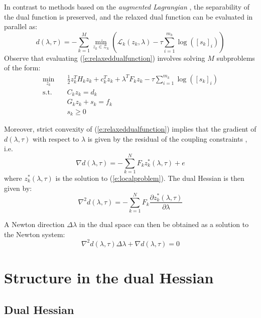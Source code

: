In contrast to methods based on the \emph{augmented Lagrangian} \cite{Kozma2013}, the separability of the dual function is preserved, and the relaxed dual function can be evaluated in parallel as:
\begin{equation}
\label{e:relaxeddualfunction}
d(\lambda, \tau) = -\sum_{k=1}^M \min_{z_k \in \mathcal{Z}_k} \left( \mathcal{L}_k(z_k, \lambda) - \tau \sum_{i=1}^{m_k} \log([s_k]_i) \right)
\end{equation}
Observe that evaluating (\ref{e:relaxeddualfunction}) involves solving $M$ subproblems of the form:
\begin{equation}
\label{e:localproblem}
\begin{aligned}
\min_{z_k} & \quad \frac{1}{2}z_k^T H_k z_k + c_k^T z_k + \lambda^TF_k z_k - \tau \sum_{i=1}^{m_k} \log([s_k]_i) \\
\text{s.t.} & \quad C_k z_k = d_k \\ 
& \quad G_k z_k + s_k = f_k \\
& \quad s_k \geq 0
\end{aligned}
\end{equation}

Moreover, strict convexity of (\ref{e:relaxeddualfunction}) implies that the gradient of $d(\lambda, \tau)$ with respect to $\lambda$ is given by the residual of the coupling constraints \cite{Bertsekas1989}, i.e.
\begin{equation}
\label{e:dualgradient}
\nabla d(\lambda, \tau) = -\sum_{k=1}^N F_k z_k^*(\lambda, \tau) + e
\end{equation}
where $z_k^*(\lambda, \tau)$ is the solution to (\ref{e:localproblem}).
The dual Hessian is then given by:
\begin{equation}
\label{e:dualhessian}
\nabla^2 d(\lambda, \tau) = -\sum_{k=1}^N F_k \frac{\partial z_k^*(\lambda, \tau)}{\partial \lambda}
\end{equation}

A Newton direction $\Delta \lambda$ in the dual space can then be obtained as a solution to the Newton system:
\begin{equation}
\label{e:NewtonSystem}
\nabla^2 d(\lambda, \tau) \Delta \lambda + \nabla d(\lambda, \tau) = 0
\end{equation}

\section{Structure in the dual Hessian}

\subsection{Dual Hessian}

